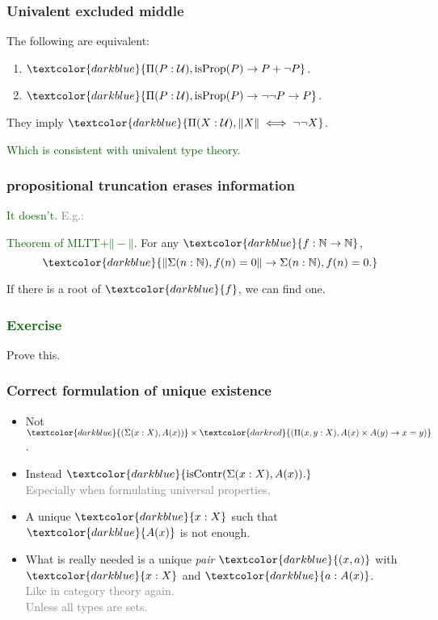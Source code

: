 \documentclass[aspectratio=169]{beamer}
\newcommand{\isProp}{\operatorname{isProp}}
\newcommand{\isContr}{\operatorname{isContr}}
\newcommand{\U}{\operatorname{\mathcal{U}}}
\newcommand{\db}{\textcolor{darkblue}}
\newcommand{\dg}{\textcolor{darkgreen}}
\newcommand{\grey}{\textcolor{grey}}
\newcommand{\dr}{\textcolor{darkred}}
\newcommand{\m}[1]{$\db{#1}$}
\newcommand{\mm}[1]{${#1}$}
\newcommand{\M}[1]{\[\db{#1}\]}
\newcommand{\N}{\mathbb{N}}
\newcommand{\trunc}[1]{{\mathord{\parallel}#1\mathord{\parallel}}}
\begin{document}
\begin{frame}
  \frametitle{Univalent excluded middle}

\vfill

The following are equivalent:
\begin{enumerate}
\vfill \item \m{\Pi(P:\U), \isProp(P) \to P + \neg P}.
\vfill \item \m{\Pi(P:\U), \isProp(P) \to \neg \neg P \to P}.
\end{enumerate}

\vfill

They imply \m{\Pi(X:\U), \trunc{X} \iff \neg\neg X}.

\vfill

\dg{Which is consistent with univalent type theory.}

\end{frame}

\begin{frame}
  \frametitle{\framebox{\dr{Myth:}} propositional truncation erases information}

\vfill

\grey{\dg{It doesn't.} E.g.:}

\vfill

\dg{Theorem of MLTT+$\trunc{-}$}. For any \m{f:\N \to \N}, 
\M{\trunc{\Sigma(n:\N), f(n)=0} \to \Sigma(n:\N), f(n)=0.} 

\vfill

If there is a root of \m{f}, we can find one.

\end{frame}

\begin{frame}
  \frametitle{\dg{Exercise}}

  Prove this.
\end{frame}

\begin{frame}
  \frametitle{Correct formulation of unique existence}

  \begin{itemize}
  \vfill \item 
Not \mm{\db{(\Sigma(x:X), A(x))} \times \dr{(\Pi(x,y:X), A(x) \times A(y) \to x=y)}}. 
  \vfill \item Instead \m{\isContr(\Sigma(x:X), A(x)).} \\[1ex]

  \grey{Especially when formulating universal properties.}

\vfill \item A unique \m{x:X} such that \m{A(x)} is not enough.

\vfill \item What is really needed is a unique \emph{pair} \m{(x,a)} with \m{x:X} and \m{a:A(x)}. \\[1ex]
\grey{Like in category theory again.} \\[1ex]
\grey{Unless all types are sets.}
  \end{itemize}

\vfill

\end{frame}
\end{document}
